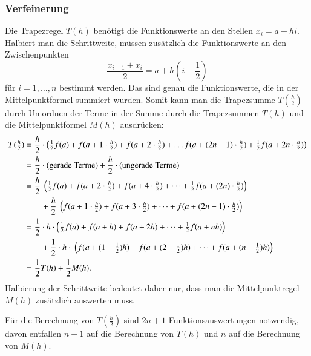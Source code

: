 \subsubsection{Verfeinerung}
%
Die Trapezregel $T(h)$ benötigt die Funktionswerte an den Stellen $x_i=a+hi$.
Halbiert man die Schrittweite, müssen zusätzlich die Funktionswerte
an den Zwischenpunkten
\[
\frac{x_{i-1}+x_{i}}{2}
= 
a+h(i-{\textstyle\frac12})
\]
für $i=1,\dots,n$ bestimmt werden.
Das sind genau die Funktionswerte, die in der Mittelpunktformel
summiert wurden.
%
Somit kann man die Trapezsumme $T(\frac{h}2)$ durch Umordnen der Terme
in der Summe durch die Trapezsummen $T(h)$ und die Mittelpunktformel
$M(h)$ ausdrücken:
\begin{align}
T({\textstyle\frac{h}2})
&=
\frac{h}2\cdot
\bigl(
{\textstyle\frac12}
f(a)
+
f(a+1\cdot {\textstyle\frac{h}2})
+
f(a+2\cdot {\textstyle\frac{h}2})
+
\dots
f(a+(2n-1)\cdot {\textstyle\frac{h}2})
+
{\textstyle\frac12}
f(a+2n\cdot {\textstyle\frac{h}2})
\bigr)
\notag
\\
&=
\frac{h}2\cdot
(\text{gerade Terme})
+
\frac{h}2\cdot
(\text{ungerade Terme})
\notag
\\
&=
\frac{h}2 \left(
{\textstyle\frac12}
f(a)
+
f(a+2\cdot {\textstyle\frac{h}2})
+
f(a+4\cdot {\textstyle\frac{h}2})
+
\dots
+
{\textstyle\frac12}
f(a+(2n)\cdot {\textstyle\frac{h}2})
\right)
\notag
\\
&\qquad
+
\frac{h}2 \left(
f(a+1\cdot {\textstyle\frac{h}2})
+
f(a+3\cdot {\textstyle\frac{h}2})
+
\dots
+
f(a+(2n-1)\cdot {\textstyle\frac{h}2})
\right)
\notag
\\
&=
\frac12\cdot h\cdot
\left(
{\textstyle\frac12}
f(a)
+
f(a+h)
+
f(a+2h)
+
\dots
+
{\textstyle\frac12}
f(a+nh)
\right)
\notag
\\
&\qquad
+
\frac12 \cdot h\cdot \left(
f(a+(1-{\textstyle\frac12})h)
+
f(a+(2-{\textstyle\frac12})h)
+
\dots
+
f(a+(n-{\textstyle\frac12})h)
\right)
\notag
\\
&=
\frac12 T(h) 
+
\frac12 M(h).
\label{buch:equation:TMrekursion}
\end{align}
Halbierung der Schrittweite bedeutet daher nur, dass man die
Mittelpunktregel $M(h)$ zusätzlich auswerten muss.
%

Für die Berechnung von $T(\frac{h}2)$ sind $2n+1$ Funktionsauswertungen
notwendig, davon entfallen $n+1$ auf die Berechnung von $T(h)$ und
$n$ auf die Berechnung von $M(h)$.

